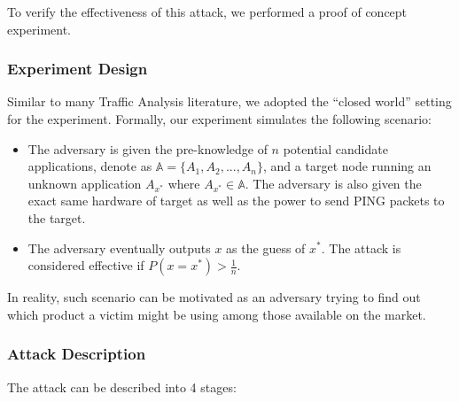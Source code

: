 To verify the effectiveness of this attack, we performed a proof of concept experiment.



\subsubsection{Experiment Design}

Similar to many Traffic Analysis literature, we adopted the ``closed world'' setting for the experiment. Formally, our experiment simulates the following scenario:
\begin{itemize}
 \item The adversary is given the pre-knowledge of $n$ potential candidate applications, denote as $\mathbb{A} = \{A_1, A_2, ..., A_n\}$, and a target node running an unknown application $A_{x^*}$ where $A_{x^*} \in \mathbb{A}$. The adversary is also given the exact same hardware of target as well as the power to send PING packets to the target.
 \item The adversary eventually outputs $x$ as the guess of $x^*$. The attack is considered effective if $P(x = x^*) > \frac{1}{n}$.
\end{itemize}

In reality, such scenario can be motivated as an adversary trying to find out which product a victim might be using among those available on the market.

\subsubsection{Attack Description \label{PingLoadAttackManual}} 

The attack can be described into 4 stages:

